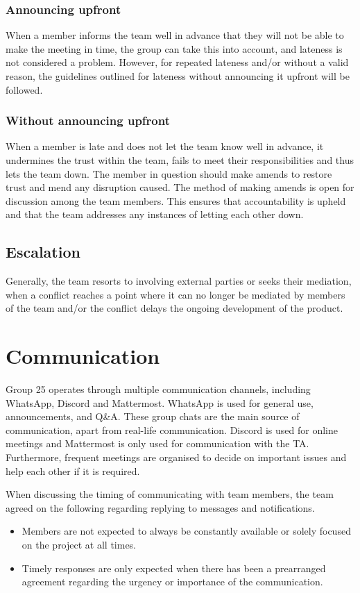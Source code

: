 \documentclass[sigconf,nonacm]{acmart}
\begin{document}
\subsubsection{Announcing upfront}
When a member informs the team well in advance that they will not be able to make the meeting in time, the group can take this into account, and lateness is not considered a problem. However, for repeated lateness and/or without a valid reason, the guidelines outlined for lateness without announcing it upfront will be followed.

\subsubsection{Without announcing upfront}
When a member is late and does not let the team know well in advance, it undermines the trust within the team, fails to meet their responsibilities and thus lets the team down. The member in question should make amends to restore trust and mend any disruption caused. The method of making amends is open for discussion among the team members. This ensures that accountability is upheld and that the team addresses any instances of letting each other down.

\subsection{Escalation}
Generally, the team resorts to involving external parties or seeks their mediation, when a conflict reaches a point where it can no longer be mediated by members of the team and/or the conflict delays the ongoing development of the product.


\section{Communication}
Group 25 operates through multiple communication channels, including WhatsApp, Discord and Mattermost. WhatsApp is used for general use, announcements, and Q\&A. These group chats are the main source of communication, apart from real-life communication. Discord is used for online meetings and Mattermost is only used for communication with the TA. Furthermore, frequent meetings are organised to decide on important issues and help each other if it is required.

When discussing the timing of communicating with team members, the team agreed on the following regarding replying to messages and notifications.
\begin{itemize}
    \item Members are not expected to always be constantly available or solely focused on the project at all times.
    \item Timely responses are only expected when there has been a prearranged agreement regarding the urgency or importance of the communication.
\end{itemize}
\end{document}
